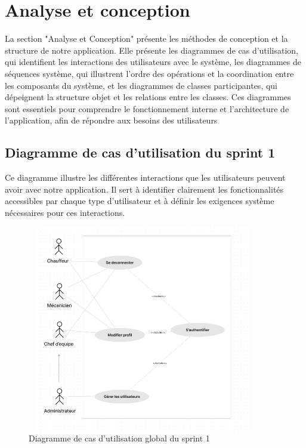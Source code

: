 \section{Analyse et conception}
La section "Analyse et Conception" présente les méthodes de conception et la structure de notre application. Elle présente les diagrammes de cas d'utilisation, qui identifient les interactions des utilisateurs avec le système, les diagrammes de séquences système, qui illustrent l'ordre des opérations et la coordination entre les composants du système, et les diagrammes de classes participantes, qui dépeignent la structure objet et les relations entre les classes. Ces diagrammes sont essentiels pour comprendre le fonctionnement interne et l'architecture de l'application, afin de  répondre aux besoins des utilisateurs


\subsection{Diagramme de cas d’utilisation du sprint 1}

Ce diagramme illustre les différentes interactions que les utilisateurs peuvent avoir avec notre application. Il sert à identifier clairement les fonctionnalités accessibles par chaque type d'utilisateur et à définir les exigences système nécessaires pour ces interactions.

\begin{figure}[ht!]
  \centering
  \includegraphics[width=0.9\textwidth,height=9cm]{chap3.images/usecase global sprint 1.png}
  \caption{Diagramme de cas d’utilisation global du sprint 1}

\end{figure}

